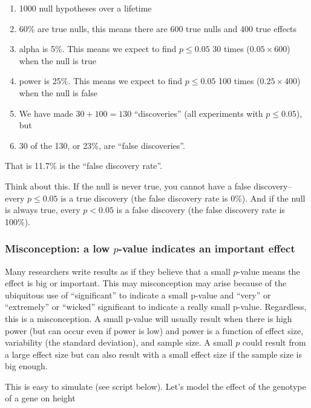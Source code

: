 \documentclass[]{book}
\providecommand{\tightlist}{%
  \setlength{\itemsep}{0pt}\setlength{\parskip}{0pt}}
\begin{document}
\begin{enumerate}
\def\labelenumi{\arabic{enumi}.}
\tightlist
\item
  1000 null hypotheses over a lifetime
\item
  60\% are true nulls, this means there are 600 true nulls and 400 true
  effects
\item
  alpha is 5\%. This means we expect to find \(p \le 0.05\) 30 times
  (\(0.05 \times 600\)) when the null is true
\item
  power is 25\%. This means we expect to find \(p \le 0.05\) 100 times
  (\(0.25 \times 400\)) when the null is false
\item
  We have made \(30 + 100=130\) ``discoveries'' (all experiments with
  \(p \le 0.05\)), but
\item
  30 of the 130, or 23\%, are ``false discoveries''.
\end{enumerate}

That is 11.7\% is the ``false discovery rate''.

Think about this. If the null is never true, you cannot have a false
discovery--every \(p \le 0.05\) is a true discovery (the false discovery
rate is 0\%). And if the null is always true, every \(p < 0.05\) is a
false discovery (the false discovery rate is 100\%).

\subsubsection{\texorpdfstring{Misconception: a low \(p\)-value
indicates an important
effect}{Misconception: a low p-value indicates an important effect}}\label{misconception-a-low-p-value-indicates-an-important-effect}

Many researchers write results as if they believe that a small
\(p\)-value means the effect is big or important. This may misconception
may arise because of the ubiquitous use of ``significant'' to indicate a
small p-value and ``very'' or ``extremely'' or ``wicked'' significant to
indicate a really small p-value. Regardless, this is a misconception. A
small p-value will usually result when there is high power (but can
occur even if power is low) and power is a function of effect size,
variability (the standard deviation), and sample size. A small \(p\)
could result from a large effect size but can also result with a small
effect size if the sample size is big enough.

This is easy to simulate (see script below). Let's model the effect of
the genotype of a gene on height
\end{document}
